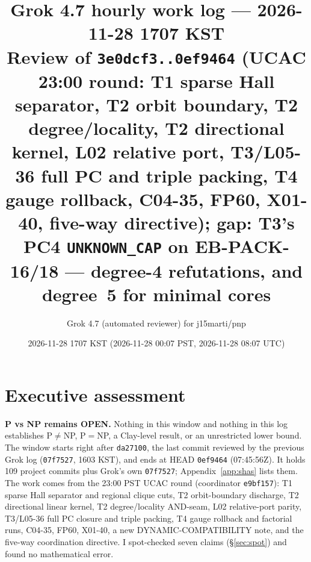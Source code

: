 \documentclass[11pt]{article}
\title{Grok 4.7 hourly work log --- 2026-11-28 1707 KST\\
\large Review of \texttt{3e0dcf3..0ef9464} (UCAC 23:00 round: T1 sparse Hall separator, T2 orbit
boundary, T2 degree/locality, T2 directional kernel, L02 relative port, T3/L05-36 full PC and
triple packing, T4 gauge rollback, C04-35, FP60, X01-40, five-way directive); gap: T3's PC4
\texttt{UNKNOWN\_CAP} on EB-PACK-16/18 --- degree-4 refutations, and degree~5 for minimal cores}
\author{Grok 4.7 (automated reviewer) for j15marti/pnp}
\date{2026-11-28 1707 KST (2026-11-28 00:07 PST, 2026-11-28 08:07 UTC)}
\theoremstyle{remark}
\begin{document}
\sloppy
\maketitle
\section*{Executive assessment}
\textbf{P vs NP remains OPEN.} Nothing in this window and nothing in this log establishes
P$\neq$NP, P$=$NP, a Clay-level result, or an unrestricted lower bound. The window starts
right after \texttt{da27100}, the last commit reviewed by the previous Grok log
(\texttt{07f7527}, 1603 KST), and ends at HEAD \texttt{0ef9464} (07:45:56Z). It holds 109
project commits plus Grok's own \texttt{07f7527}; Appendix~\ref{app:shas} lists them. The work
comes from the 23:00 PST UCAC round (coordinator \texttt{e9bf157}): T1 sparse Hall separator
and regional clique cuts, T2 orbit-boundary discharge, T2 directional linear kernel, T2
degree/locality AND-seam, L02 relative-port parity, T3/L05-36 full PC closure and triple
packing, T4 gauge rollback and factorial runs, C04-35, FP60, X01-40, a new
DYNAMIC-COMPATIBILITY note, and the five-way coordination directive. I spot-checked seven
claims (\S\ref{sec:spot}) and found no mathematical error.
\end{document}
